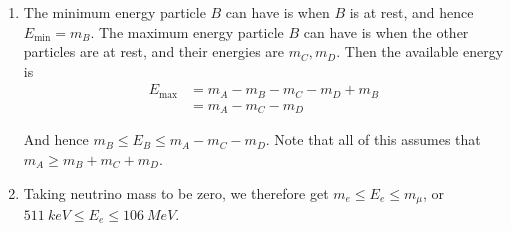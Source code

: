 \begin{enumerate}
	\item The minimum energy particle $B$ can have is when $B$ is at rest, and hence $E_{\text{min}} = m_B$. The maximum energy particle $B$ can have is when the other particles are at rest, and their energies are $m_C, m_D$. Then the available energy is
	\begin{align*}
		E_{\text{max}} &= m_A - m_B - m_C - m_D + m_B\\
			&= m_A - m_C - m_D
	\end{align*}
	
	And hence $m_B \leq E_B \leq m_A - m_C - m_D$. Note that all of this assumes that $m_A \geq m_B + m_C + m_D$.

	\item Taking neutrino mass to be zero, we therefore get $m_e \leq E_e \leq m_\mu$, or $\SI{511}{keV} \leq E_e \leq \SI{106}{MeV}$.
\end{enumerate}